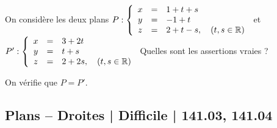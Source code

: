 \begin{question}
 
On considère les deux plans  $P : \left\{\begin{array}{ccl}x&=&1+t+s\\y&=&-1+t\\ z&=&2+t-s,\quad (t,s  \in \mathbb{R})  \end{array}\right.$ et 
$P': \left\{\begin{array}{ccl}x&=&3+2t\\y&=&t+s\\ z&=&2+2s,\quad (t,s  \in \mathbb{R}) \end{array}\right.$  Quelles sont les assertions vraies ?
\begin{answers}


 
    
    
\end{answers}
\begin{explanations}
On vérifie que $P=P'$.
\end{explanations}

\end{question}



\subsection{Plans -- Droites | Difficile | 141.03, 141.04}
 
